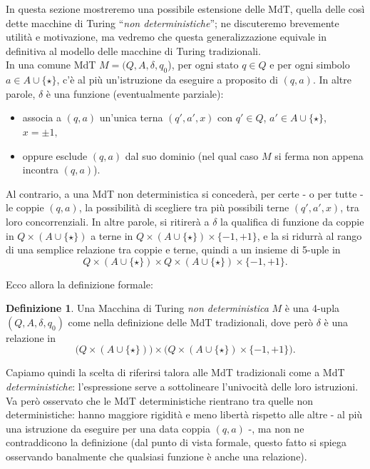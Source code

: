 \documentclass[12pt,a4paper]{report}
\theoremstyle{definition}
\newtheorem{defn}[teo]{Definizione}  %
\begin{document}
In questa sezione mostreremo una possibile estensione delle MdT, quella delle così dette macchine di Turing ``\emph{non deterministiche}''; ne discuteremo brevemente utilità e motivazione, ma vedremo che questa generalizzazione equivale in definitiva al modello delle macchine di Turing tradizionali.\\
In una comune MdT $M = (Q,A,\delta,q_0$), per ogni stato $q \in Q$ e per ogni simbolo $a \in A \cup \{\star\}$, c'è al più un'istruzione da eseguire a proposito di $(q,a)$. In altre parole, $\delta$ è una funzione (eventualmente parziale):
\begin{itemize}
\item associa a $(q,a)$ un'unica terna $(q',a',x)$ con $q' \in Q$, $a' \in A \cup \{\star\}$, $x = \pm 1,$
\item oppure esclude $(q,a)$ dal suo dominio (nel qual caso $M$ si ferma non appena incontra $(q,a)$).
\end{itemize}
Al contrario, a una MdT non deterministica si concederà, per certe - o per tutte - le coppie $(q,a)$, la possibilità di scegliere tra più possibili terne $(q',a',x)$, tra loro concorrenziali. In altre parole, si ritirerà a $\delta$ la qualifica di funzione da coppie in $Q \times (A \cup \{\star\})$ a terne in $Q \times (A \cup \{\star\}) \times \{-1,+1\}$, e la si ridurrà al rango di una semplice relazione tra coppie e terne, quindi a un insieme di 5-uple in 
$$Q \times (A \cup \{\star\}) \times Q \times (A \cup \{\star\}) \times \{-1,+1\}.$$

Ecco allora la definizione formale:

\begin{defn}
Una Macchina di Turing \emph{non deterministica} $M$ è una 4-upla $(Q,A,\delta,q_0)$ come nella definizione delle MdT tradizionali, dove però $\delta$ è una relazione in 
$$\big( Q \times (A \cup \{\star\}) \big) \times \big( Q \times (A \cup \{\star\}) \times \{-1,+1\} \big).$$

\end{defn}

Capiamo quindi la scelta di riferirsi talora alle MdT tradizionali come a MdT \emph{deterministiche}: l'espressione serve a sottolineare l'univocità delle loro istruzioni. Va però osservato che le MdT deterministiche rientrano tra quelle non deterministiche: hanno maggiore rigidità e meno libertà rispetto alle altre - al più una istruzione da eseguire per una data coppia $(q,a)$ -, ma non ne contraddicono la definizione (dal punto di vista formale, questo fatto si spiega osservando banalmente che qualsiasi funzione è anche una relazione).
\end{document}
